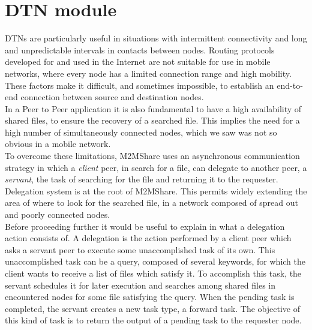 %

\section{DTN module}
DTNs are particularly useful in situations with intermittent connectivity and long and unpredictable intervals in contacts between nodes. Routing protocols developed for and used in the Internet are not suitable for use in mobile networks, where every node has a limited connection range and high mobility. These factors make it difficult, and sometimes impossible, to establish an end-to-end connection between source and destination nodes.
\\

In a Peer to Peer application it is also fundamental to have a high availability of shared files, to ensure the recovery of a searched file. This implies the need for a high number of simultaneously connected nodes, which we saw was not so obvious in a mobile network.
\\

To overcome these limitations, M2MShare uses an asynchronous communication strategy in which a \textit{client} peer, in search for a file, can delegate to another peer, a \textit{servant}, the task of searching for the file and returning it to the requester. Delegation system is at the root of M2MShare. This permits widely extending the area of where to look for the searched file, in a network composed of spread out and poorly connected nodes.
\\

Before proceeding further it would be useful to explain in what a delegation action consists of. A delegation is the action performed by a client peer which asks a servant peer to execute some unaccomplished task of its own. This unaccomplished task can be a query, composed of several keywords, for which the client wants to receive a list of files which satisfy it. To accomplish this task, the servant schedules it for later execution and searches among shared files in encountered nodes for some file satisfying the query. When the pending task is completed, the servant creates a new task type, a forward task. The objective of this kind of task is to return the output of a pending task to the requester node. 
\\

